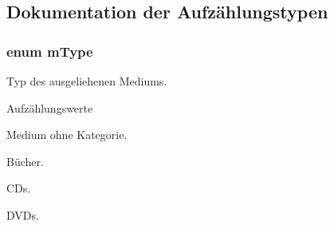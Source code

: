 \subsection{Dokumentation der Aufzählungstypen}
\subsubsection[{\texorpdfstring{m\+Type}{mType}}]{\setlength{\rightskip}{0pt plus 5cm}enum {\bf m\+Type}}\hypertarget{group___lend_lib_item_ga636cfca014f3212ea82d45e28f9cb51b}{}\label{group___lend_lib_item_ga636cfca014f3212ea82d45e28f9cb51b}


Typ des ausgeliehenen Mediums. 

\begin{Desc}
\item[Aufzählungswerte]\par
\begin{description}
\item[{\em 
other\hypertarget{group___lend_lib_item_gga636cfca014f3212ea82d45e28f9cb51ba7e338ad381a84ef6df07e7d425707025}{}\label{group___lend_lib_item_gga636cfca014f3212ea82d45e28f9cb51ba7e338ad381a84ef6df07e7d425707025}
}]Medium ohne Kategorie. \item[{\em 
book\hypertarget{group___lend_lib_item_gga636cfca014f3212ea82d45e28f9cb51ba6053cbf2a0d801307c80aec065560db6}{}\label{group___lend_lib_item_gga636cfca014f3212ea82d45e28f9cb51ba6053cbf2a0d801307c80aec065560db6}
}]Bücher. \item[{\em 
cd\hypertarget{group___lend_lib_item_gga636cfca014f3212ea82d45e28f9cb51bae7dab93ee81e7f74327bed188e6f3748}{}\label{group___lend_lib_item_gga636cfca014f3212ea82d45e28f9cb51bae7dab93ee81e7f74327bed188e6f3748}
}]C\+Ds. \item[{\em 
dvd\hypertarget{group___lend_lib_item_gga636cfca014f3212ea82d45e28f9cb51ba9250e48899d18438f51e7df957e35ea5}{}\label{group___lend_lib_item_gga636cfca014f3212ea82d45e28f9cb51ba9250e48899d18438f51e7df957e35ea5}
}]D\+V\+Ds. \end{description}
\end{Desc}
